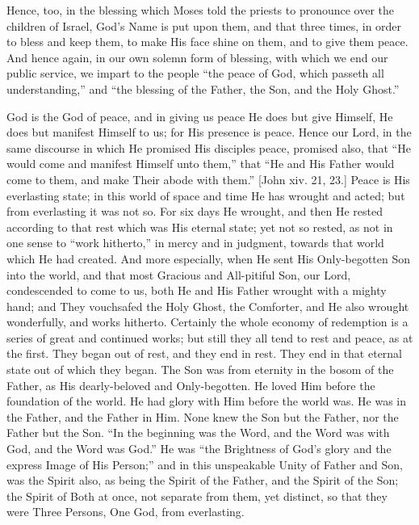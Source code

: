 Hence, too, in the blessing which Moses told the priests to
pronounce over the children of Israel, God's Name is put upon them,
and that three times, in order to bless and keep them, to make His
face shine on them, and to give them peace. And hence again, in our
own solemn form of blessing, with which we end our public service, we
impart to the people ``the peace of God, which passeth all
understanding,'' and ``the blessing of the Father, the Son,
and the Holy Ghost.''

God is the God of peace, and in giving us peace He does but give
Himself, He does but manifest Himself to us; for His presence is
peace. Hence our Lord, in the same discourse in which He promised His
disciples peace, promised also, that ``He would come and manifest
Himself unto them,'' that ``He and His Father would come to
them, and make Their abode with them.'' [John xiv. 21, 23.] Peace
is His everlasting state; in this world of space and time He has
wrought and acted; but from everlasting it was not so. For six days He
wrought, and then He rested according to that rest which was His
eternal state; yet not so rested, as not in one sense to ``work
hitherto,'' in mercy and in judgment, towards that world which He
had created. And more especially, when He sent His Only-begotten Son
into the world, and that most Gracious and All-pitiful Son, our Lord,
condescended to come to us, both He and His Father wrought with a
mighty hand; and They vouchsafed the Holy Ghost, the Comforter, and He
also wrought wonderfully, and works hitherto. Certainly the whole
economy of redemption is a series of great and continued works; but
still they all tend to rest and peace, as at the first. They began out
of rest, and they end in rest. They end in that eternal state out of
which they began. The Son was from eternity in the bosom of the
Father, as His dearly-beloved and Only-begotten. He loved Him before
the foundation of the world. He had glory with Him before the world
was. He was in the Father, and the Father in Him. None knew the Son
but the Father, nor the Father but the Son. ``In the beginning was
the Word, and the Word was with God, and the Word was God.'' He
was ``the Brightness of God's glory and the express Image of His
Person;'' and in this unspeakable Unity of Father and Son, was the
Spirit also, as being the Spirit of the Father, and the Spirit of the
Son; the Spirit of Both at once, not separate from them, yet distinct,
so that they were Three Persons, One God, from everlasting.

